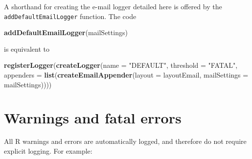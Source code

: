 \documentclass[]{article}
\newenvironment{Shaded}{\begin{snugshade}}{\end{snugshade}}
\newcommand{\CommentTok}[1]{\textcolor[rgb]{0.56,0.35,0.01}{\textit{#1}}}
\newcommand{\DataTypeTok}[1]{\textcolor[rgb]{0.13,0.29,0.53}{#1}}
\newcommand{\KeywordTok}[1]{\textcolor[rgb]{0.13,0.29,0.53}{\textbf{#1}}}
\newcommand{\NormalTok}[1]{#1}
\newcommand{\OperatorTok}[1]{\textcolor[rgb]{0.81,0.36,0.00}{\textbf{#1}}}
\newcommand{\StringTok}[1]{\textcolor[rgb]{0.31,0.60,0.02}{#1}}
\begin{document}
A shorthand for creating the e-mail logger detailed here is offered by
the \texttt{addDefaultEmailLogger} function. The code

\begin{Shaded}
\begin{Highlighting}[]
\KeywordTok{addDefaultEmailLogger}\NormalTok{(mailSettings)}
\end{Highlighting}
\end{Shaded}

is equivalent to

\begin{Shaded}
\begin{Highlighting}[]
 \KeywordTok{registerLogger}\NormalTok{(}\KeywordTok{createLogger}\NormalTok{(}\DataTypeTok{name =} \StringTok{"DEFAULT"}\NormalTok{,}
                             \DataTypeTok{threshold =} \StringTok{"FATAL"}\NormalTok{,}
                             \DataTypeTok{appenders =} \KeywordTok{list}\NormalTok{(}\KeywordTok{createEmailAppender}\NormalTok{(}\DataTypeTok{layout =}\NormalTok{ layoutEmail,}
                                                                  \DataTypeTok{mailSettings =}\NormalTok{ mailSettings))))}
\end{Highlighting}
\end{Shaded}

\hypertarget{warnings-and-fatal-errors}{%
\section{Warnings and fatal errors}\label{warnings-and-fatal-errors}}

All R warnings and errors are automatically logged, and therefore do not
require explicit logging. For example:

\begin{Shaded}
\end{Shaded}
\end{document}
